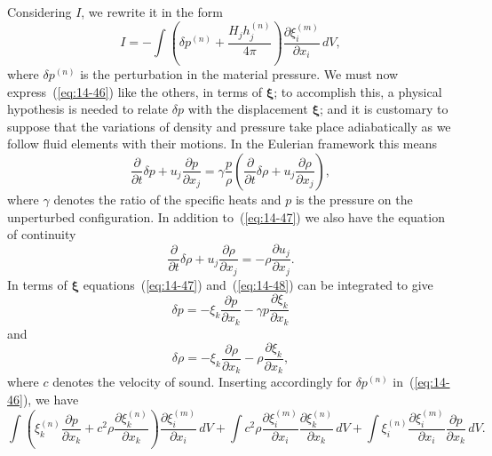Considering $I$, we rewrite it in the form
\begin{equation}
\label{eq:14-46}
I = -\int \left(\delta p^{(n)} + \frac{H_j h_j^{(n)}}{4\pi}\right) \frac{\partial \xi_i^{(m)}}{\partial x_i} \, dV,
\end{equation}
where $\delta p^{(n)}$ is the perturbation in the material pressure. We must now express~(\ref{eq:14-46}) like the others, in terms of $\boldsymbol{\xi}$; to accomplish this, a physical hypothesis is needed to relate $\delta p$ with the displacement $\boldsymbol{\xi}$; and it is customary to suppose that the variations of density and pressure take place adiabatically as we follow fluid elements with their motions. In the Eulerian framework this means
\begin{equation}
\label{eq:14-47}
\frac{\partial}{\partial t} \delta p + u_j \frac{\partial p}{\partial x_j} = \gamma \frac{p}{\rho}\left(\frac{\partial}{\partial t} \delta \rho + u_j \frac{\partial \rho}{\partial x_j}\right),
\end{equation}
where $\gamma$ denotes the ratio of the specific heats and $p$ is the pressure on the unperturbed configuration. In addition to~(\ref{eq:14-47}) we also have the equation of continuity
\begin{equation}
\label{eq:14-48}
\frac{\partial}{\partial t} \delta \rho + u_j \frac{\partial \rho}{\partial x_j} = -\rho \frac{\partial u_j}{\partial x_j}.
\end{equation}
In terms of $\boldsymbol{\xi}$ equations~(\ref{eq:14-47}) and~(\ref{eq:14-48}) can be integrated to give
\begin{equation}
\label{eq:14-49}
\delta p = -\xi_k \frac{\partial p}{\partial x_k} - \gamma p \frac{\partial \xi_k}{\partial x_k}
\end{equation}
and
\begin{equation}
\label{eq:14-50}
\delta \rho = -\xi_k \frac{\partial \rho}{\partial x_k} - \rho \frac{\partial \xi_k}{\partial x_k},
\end{equation}
where $c$ denotes the velocity of sound. Inserting accordingly for $\delta p^{(n)}$ in~(\ref{eq:14-46}), we have
\begin{equation}
\label{eq:14-51}
\int \left(\xi_k^{(n)} \frac{\partial p}{\partial x_k} + c^2 \rho \frac{\partial \xi_k^{(n)}}{\partial x_k}\right) \frac{\partial \xi_i^{(m)}}{\partial x_i} \, dV + \int c^2 \rho \frac{\partial \xi_i^{(m)}}{\partial x_i} \frac{\partial \xi_k^{(n)}}{\partial x_k} \, dV + \int \xi_i^{(n)} \frac{\partial \xi_i^{(m)}}{\partial x_i} \frac{\partial p}{\partial x_k} \, dV.
\end{equation}
